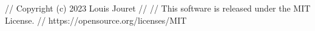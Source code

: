 // Copyright (c) 2023 Louis Jouret
// 
// This software is released under the MIT License.
// https://opensource.org/licenses/MIT

